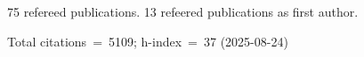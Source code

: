 75 refereed publications. 13 refeered publications as first author.

Total citations~=~5109; h-index~=~37 (2025-08-24)
